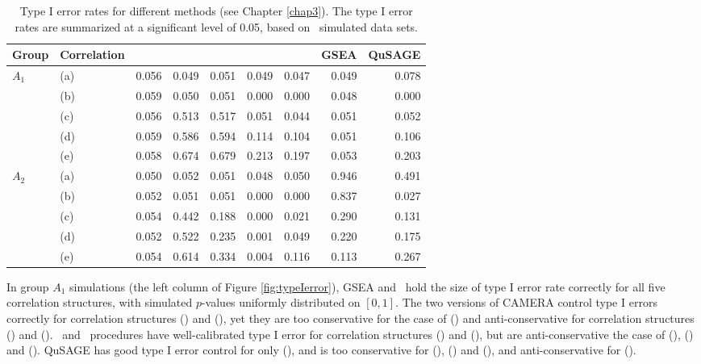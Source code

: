 			\begin{landscape}		
				\begin{table}[th]
					\caption[Type I error rates for different methods]{Type I error rates for 
					different methods (see Chapter \ref{chap3}). The type I error rates are 
					summarized at a significant level of 0.05, based on \HowmanySimu~simulated data 
					sets.}
					\label{table:apptypeIerror1}
					\centering
					\begin{tabular}{llrrrrrrr}
						\hline
						Group & Correlation & \OurMethod & \genr & \gent & \CMT & \CMR & GSEA & 
						QuSAGE 
						\\
						\hline
						\multirow{5}{*}{$A_1$}  & (a) & 0.056 & 0.049 & 0.051 & 0.049 & 0.047 & 
						0.049 & 
						0.078 
						\\ 
						& (b) & 0.059 & 0.050 & 0.051 & 0.000 & 0.000 & 0.048 & 0.000 \\ 
						& (c) & 0.056 & 0.513 & 0.517 & 0.051 & 0.044 & 0.051 & 0.052 \\ 
						& (d) & 0.059 & 0.586 & 0.594 & 0.114 & 0.104 & 0.051 & 0.106 \\ 
						& (e) & 0.058 & 0.674 & 0.679 & 0.213 & 0.197 & 0.053 & 0.203 \\ \hline
						\multirow{5}{*}{$A_2$} & (a) & 0.050 & 0.052 & 0.051 & 0.048 & 0.050 & 
						0.946 & 
						0.491 \\ 
						& (b) & 0.052 & 0.051 & 0.051 & 0.000 & 0.000 & 0.837 & 0.027 \\ 
						& (c) & 0.054 & 0.442 & 0.188 & 0.000 & 0.021 & 0.290 & 0.131 \\ 
						& (d) & 0.052 & 0.522 & 0.235 & 0.001 & 0.049 & 0.220 & 0.175 \\ 
						& (e) & 0.054 & 0.614 & 0.334 & 0.004 & 0.116 & 0.113 & 0.267 \\ 
						\hline
					\end{tabular}
				\end{table}
				
			\end{landscape}	
			
	
		
	In group $A_1$ simulations (the left column of Figure \ref{fig:typeIerror}),  GSEA and
	\OurMethod~hold the size of type I error rate correctly for all five correlation structures, 
	with simulated $p$-values uniformly distributed on $[0, 1]$. The two versions of CAMERA control 
	type I errors correctly for correlation structures (\aaCase) and (\aCase), yet they are too 
	conservative for the case of (\cCase) and anti-conservative for correlation structures (\eCase) 
	and (\fCase). \gent~and \genr~procedures have well-calibrated type I error for correlation 
	structures (\aaCase) and (\cCase), but are anti-conservative the case of (\aCase), (\eCase) and 
	(\fCase). QuSAGE has good type I error control for only (\aCase), and is too conservative for 
	(\aaCase), (\eCase) and	(\fCase), and anti-conservative for (\cCase).
	
